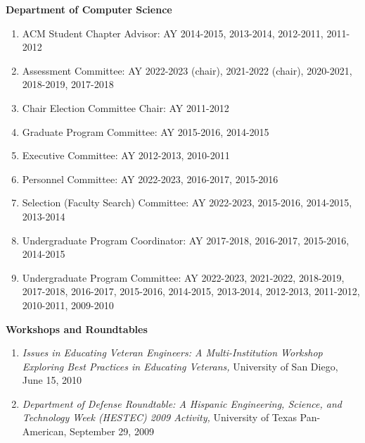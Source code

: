 \documentclass[11pt]{letter}
\begin{document}
\textbf{Department of Computer Science}
\begin{enumerate}
\item ACM Student Chapter Advisor: AY 2014-2015, 2013-2014, 2012-2011, 2011-2012
\item Assessment Committee: AY 2022-2023 (chair), 2021-2022 (chair), 2020-2021, 2018-2019, 2017-2018
\item Chair Election Committee Chair: AY 2011-2012
\item Graduate Program Committee: AY 2015-2016, 2014-2015
\item Executive Committee: AY 2012-2013, 2010-2011
\item Personnel Committee: AY 2022-2023, 2016-2017, 2015-2016
\item Selection (Faculty Search) Committee: AY 2022-2023, 2015-2016, 2014-2015, 2013-2014
\item Undergraduate Program Coordinator: AY 2017-2018, 2016-2017, 2015-2016, 2014-2015
\item Undergraduate Program Committee: AY 2022-2023, 2021-2022, 2018-2019, 2017-2018, 2016-2017, 2015-2016, 2014-2015, 2013-2014, 2012-2013, 2011-2012, 2010-2011, 2009-2010
\end{enumerate}

\textbf{Workshops and Roundtables}
\begin{enumerate}
\item \emph{Issues in Educating Veteran Engineers: A Multi-Institution Workshop Exploring Best Practices in Educating Veterans,} University of San Diego, June 15, 2010
\item \emph{Department of Defense Roundtable: A Hispanic Engineering, Science, and Technology Week (HESTEC) 2009 Activity,} University of Texas Pan-American, September 29, 2009
\end{enumerate}
\end{document}
